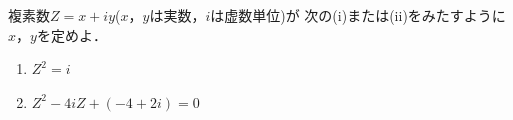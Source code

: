\documentclass[../../main.tex]{subfiles}
\begin{document}
複素数$Z=x+iy$($x$，$y$は実数，$i$は虚数単位)が
次の(i)または(ii)をみたすように$x$，$y$を定めよ．
\begin{enumerate}
  \item[(i)] $Z^2=i$
  \item[(ii)] $Z^2-4iZ+(-4+2i)=0$
\end{enumerate}
\end{document}
